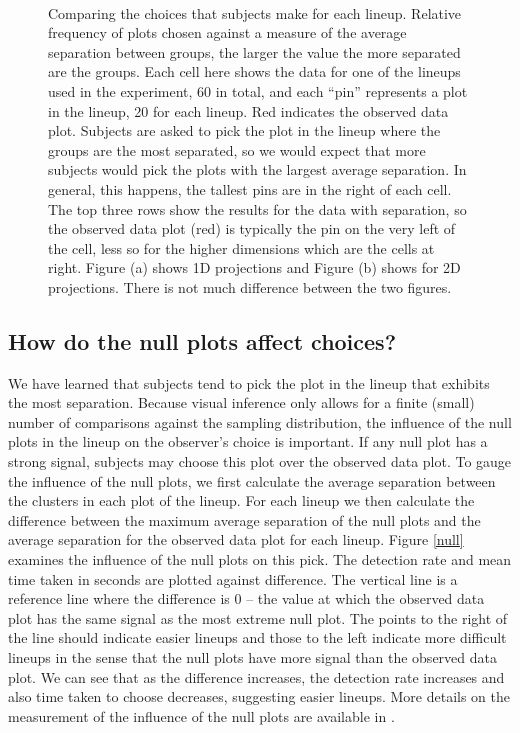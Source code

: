 \begin{figure}[htbp]
\centering
\mbox{\quad
{}}
\caption{Comparing the choices that subjects make for each lineup. Relative frequency of plots chosen against a measure of the average separation between groups, the larger the value the more separated are the groups. Each cell here shows the data for one of the lineups used in the experiment, 60 in total, and each ``pin'' represents a plot in the lineup, 20 for each lineup. Red indicates the observed data plot. Subjects are asked to pick the plot in the lineup where the groups are the most separated, so we would expect that more subjects would pick the plots with the largest average separation. In general, this happens, the tallest pins are in the right of each cell. The top three rows show the results for the data with separation, so the observed data plot (red) is typically the pin on the very left of the cell, less so for the higher dimensions which are the cells at right. Figure (a) shows 1D projections and Figure (b) shows for 2D projections. There is not much difference between the two figures. } 
\label{sep}
\end{figure}

\subsection{How do the null plots affect choices?}

We have learned that subjects tend to pick the plot in the lineup that exhibits the most separation.  Because visual inference only allows for a finite (small) number of comparisons against the sampling distribution, the influence of the null plots in the lineup on the observer's choice is important. If any null plot has a strong signal, subjects may choose this plot over the observed data plot. To gauge the influence of the null plots, we first calculate the average separation between the clusters in each plot of the lineup. For each lineup we then calculate the difference between the maximum average separation of the null plots and the average separation for the observed data plot for each lineup. Figure \ref{null} examines the influence of the null plots on this pick. The detection rate and mean time taken in seconds are plotted against difference. The vertical line is a reference line where the difference is 0 -- the value at which the observed data plot has the same signal as the most extreme null plot. The points to the right of the line should indicate easier lineups and those to the left indicate more difficult lineups in the sense that the null plots have more signal than the observed data plot. We can see that as the difference increases, the detection rate increases and also time taken to choose decreases, suggesting easier lineups. More details on the measurement of the influence of the null plots are available in \cite{roychowdhury:2012}.


